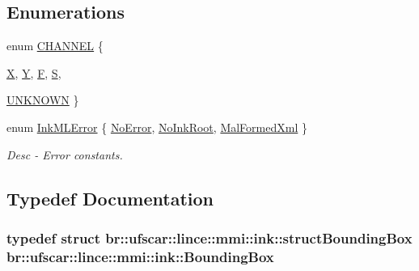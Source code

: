 \subsection*{Enumerations}
\begin{DoxyCompactItemize}
\item 
enum \hyperlink{namespacebr_1_1ufscar_1_1lince_1_1mmi_1_1ink_a857f7b80c5d28f256c70d78cacf91dab}{CHANNEL} \{ \par
\hyperlink{namespacebr_1_1ufscar_1_1lince_1_1mmi_1_1ink_a857f7b80c5d28f256c70d78cacf91daba5b4adb4f2604c7cf6ac2dcb04b62a7f6}{X}, 
\hyperlink{namespacebr_1_1ufscar_1_1lince_1_1mmi_1_1ink_a857f7b80c5d28f256c70d78cacf91daba5af4e4586325aca2cc29309c4358f8f3}{Y}, 
\hyperlink{namespacebr_1_1ufscar_1_1lince_1_1mmi_1_1ink_a857f7b80c5d28f256c70d78cacf91dabace9b3468aa2f2d6d34f3a13c9c17faf7}{F}, 
\hyperlink{namespacebr_1_1ufscar_1_1lince_1_1mmi_1_1ink_a857f7b80c5d28f256c70d78cacf91daba169d0e0b5c89cf62bcd060135ea38ff6}{S}, 
\par
\hyperlink{namespacebr_1_1ufscar_1_1lince_1_1mmi_1_1ink_a857f7b80c5d28f256c70d78cacf91dababf4cfb47dbf9cc85c60abb4083518d2f}{UNKNOWN}
 \}
\item 
enum \hyperlink{namespacebr_1_1ufscar_1_1lince_1_1mmi_1_1ink_a682c285834346cbf7587dd58c9832fe4}{InkMLError} \{ \hyperlink{namespacebr_1_1ufscar_1_1lince_1_1mmi_1_1ink_a682c285834346cbf7587dd58c9832fe4a32bff24228b0ec7a47a91f5736726da0}{NoError}, 
\hyperlink{namespacebr_1_1ufscar_1_1lince_1_1mmi_1_1ink_a682c285834346cbf7587dd58c9832fe4a8bd19fd9798a5d3bb3598c25a82abc7a}{NoInkRoot}, 
\hyperlink{namespacebr_1_1ufscar_1_1lince_1_1mmi_1_1ink_a682c285834346cbf7587dd58c9832fe4a8c3f0ab9c632f8200fad028d18c75953}{MalFormedXml}
 \}
\begin{DoxyCompactList}\small\item\em Desc -\/ Error constants. \item\end{DoxyCompactList}\end{DoxyCompactItemize}


\subsection{Typedef Documentation}
\hypertarget{namespacebr_1_1ufscar_1_1lince_1_1mmi_1_1ink_aa98c72748d18ed23e3c98904db888f3d}{
\subsubsection[{BoundingBox}]{\setlength{\rightskip}{0pt plus 5cm}typedef struct {\bf br::ufscar::lince::mmi::ink::structBoundingBox} {\bf br::ufscar::lince::mmi::ink::BoundingBox}}}
\label{namespacebr_1_1ufscar_1_1lince_1_1mmi_1_1ink_aa98c72748d18ed23e3c98904db888f3d}


